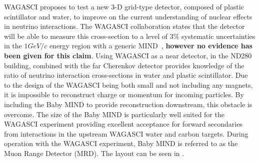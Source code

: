 
WAGASCI proposes to test a new 3-D grid-type detector, composed of plastic scintillator and water, to improve on the current understanding of nuclear effects in neutrino interactions. The WAGASCI collaboration states that the detector will be able to measure this cross-section to a level of 3\% systematic uncertainties in the $1 GeV/c$ energy region with a generic MIND~\cite{30WAGASCI}, \textbf{however no evidence has been given for this claim}. Using WAGASCI as a near detector, in the ND280 building, combined with the far Cherenkov detector provides knowledge of the ratio of neutrino interaction cross-sections in water and plastic scintillator. Due to the design of the WAGASCI being both small and not including any magnets, it is impossible to reconstruct charge or momentum for incoming particles. By including the Baby MIND to provide reconstruction downstream, this obstacle is overcome. The size of the Baby MIND is particularly well suited for the WAGASCI experiment providing excellent acceptance for forward secondaries from interactions in the upstream WAGASCI water and carbon targets. During operation with the WAGASCI experiment, Baby MIND is referred to as the Muon Range Detector (MRD). The layout can be seen in .




